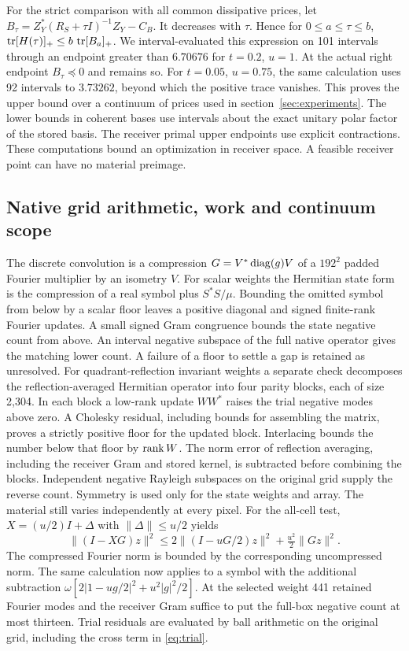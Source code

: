 For the strict comparison with all common dissipative prices, let $B_\tau=Z_Y^*(R_S+\tau I)^{-1}Z_Y-C_B$. It decreases with $\tau$. Hence for $0\le a\le\tau\le b$, $\operatorname{tr}[H(\tau)]_+\le b\,\operatorname{tr}[B_a]_+$. We interval-evaluated this expression on 101 intervals through an endpoint greater than $6.70676$ for $t=0.2$, $u=1$. At the actual right endpoint $B_\tau\preceq0$ and remains so. For $t=0.05$, $u=0.75$, the same calculation uses 92 intervals to $3.73262$, beyond which the positive trace vanishes. This proves the upper bound over a continuum of prices used in section~\ref{sec:experiments}. The lower bounds in coherent bases use intervals about the exact unitary polar factor of the stored basis. The receiver primal upper endpoints use explicit contractions. These computations bound an optimization in receiver space. A feasible receiver point can have no material preimage.

\subsection*{Native grid arithmetic, work and continuum scope}

The discrete convolution is a compression $G=V^*\operatorname{diag}(g)V$ of a $192^2$ padded Fourier multiplier by an isometry $V$. For scalar weights the Hermitian state form is the compression of a real symbol plus $S^*S/\mu$. Bounding the omitted symbol from below by a scalar floor leaves a positive diagonal and signed finite-rank Fourier updates. A small signed Gram congruence bounds the state negative count from above. An interval negative subspace of the full native operator gives the matching lower count. A failure of a floor to settle a gap is retained as unresolved. For quadrant-reflection invariant weights a separate check decomposes the reflection-averaged Hermitian operator into four parity blocks, each of size 2,304. In each block a low-rank update $WW^*$ raises the trial negative modes above zero. A Cholesky residual, including bounds for assembling the matrix, proves a strictly positive floor for the updated block. Interlacing bounds the number below that floor by $\operatorname{rank} W$. The norm error of reflection averaging, including the receiver Gram and stored kernel, is subtracted before combining the blocks. Independent negative Rayleigh subspaces on the original grid supply the reverse count. Symmetry is used only for the state weights and array. The material still varies independently at every pixel. For the all-cell test, $X=(u/2)I+\Delta$ with $\|\Delta\|\le u/2$ yields
\[
 \|(I-XG)z\|^2\le
 2\|(I-uG/2)z\|^2+\tfrac{u^2}{2}\|Gz\|^2 .
\]
The compressed Fourier norm is bounded by the corresponding uncompressed norm. The same calculation now applies to a symbol with the additional subtraction $\omega[2|1-ug/2|^2+u^2|g|^2/2]$. At the selected weight 441 retained Fourier modes and the receiver Gram suffice to put the full-box negative count at most thirteen. Trial residuals are evaluated by ball arithmetic on the original grid, including the cross term in \eqref{eq:trial}.

